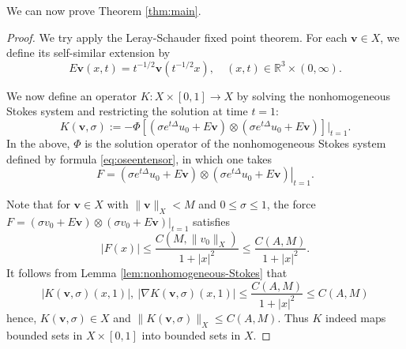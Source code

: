 \documentclass[12pt]{amsart}
\numberwithin{equation}{section}              %
\theoremstyle{remark}
\newcommand{\Bv}{{\boldsymbol{v}}}
\begin{document}
		We  can now prove Theorem \ref{thm:main}.
		\begin{proof}
			We try apply the Leray-Schauder
			fixed point theorem.
			For each $\Bv \in X$, we define its self-similar extension by
			\begin{equation*}
				E\Bv (x,t) = t^{-1/2} \Bv(t^{-1/2} x), \quad (x,t) \in \mathbb{R}^3\times (0,\infty).
			\end{equation*}
			
			We now define an operator $K: X \times [0, 1] \to X$ by solving the  nonhomogeneous Stokes system and restricting the solution at time $t=1$:
			\begin{equation} 
				K(\Bv, \sigma) := -\Phi[(\sigma e^{t\Delta}u_0 + E\Bv) \otimes (\sigma e^{t\Delta}u_0 + E\Bv)] \big|_{t=1}.
			\end{equation}
			In the above, $\Phi$ is the solution operator of the nonhomogeneous Stokes system defined by formula \eqref{eq:oseentensor}, in which one takes
			\begin{equation*}
				\left. F= (\sigma e^{t\Delta}u_0 + E\Bv) \otimes (\sigma e^{t\Delta}u_0 + E\Bv)\right|_{t=1}.
			\end{equation*}
			
			
			Note that for $\Bv \in X$ with $\|\Bv\|_X < M$ and $0 \leq \sigma \leq 1$, the force 	$\left. F= (\sigma v_0 + E\Bv) \otimes (\sigma v_0 + E\Bv)\right|_{t=1}$ satisfies
			\begin{equation*}
				|F(x)|\leq \frac{C(M, \|v_0\|_X)}{1+|x|^2}\leq \frac{C(A,M)}{1+|x|^2}.
			\end{equation*}
			It follows from Lemma \ref{lem:nonhomogeneous-Stokes} that 
			\begin{equation*}
				|K(\Bv, \sigma) (x,1)|,~ |\nabla K(\Bv, \sigma) (x,1)| \leq \frac{C(A, M)}{1+|x|^2}\leq C(A,M)
			\end{equation*}
			hence, $K(\Bv, \sigma)\in X$ and $\| K(\Bv, \sigma) \|_X \leq C(A,M)$. 
			Thus $K$ indeed maps bounded sets in $X \times [0, 1]$ into bounded sets in $X$.
			

\end{proof}
\end{document}

